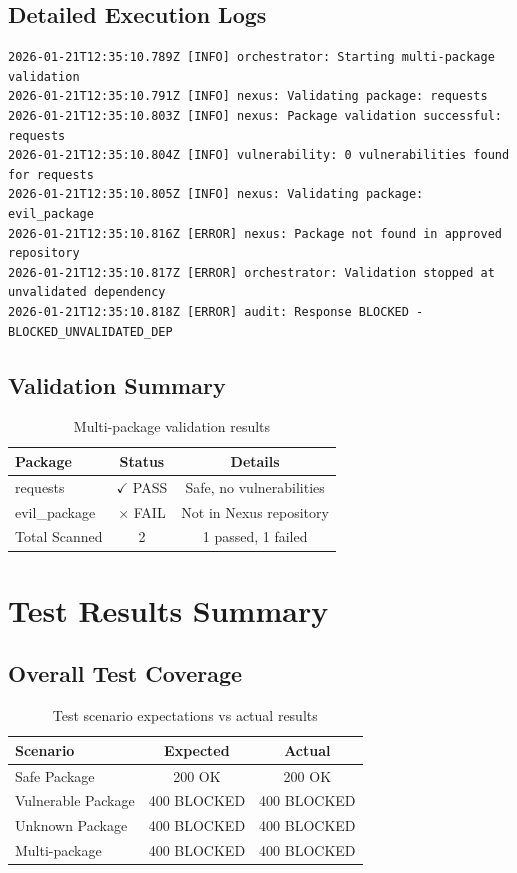 \documentclass[11pt, a4paper]{article}
\begin{document}
\subsection{Detailed Execution Logs}
\begin{lstlisting}[style=logstyle]
2026-01-21T12:35:10.789Z [INFO] orchestrator: Starting multi-package validation
2026-01-21T12:35:10.791Z [INFO] nexus: Validating package: requests
2026-01-21T12:35:10.803Z [INFO] nexus: Package validation successful: requests
2026-01-21T12:35:10.804Z [INFO] vulnerability: 0 vulnerabilities found for requests
2026-01-21T12:35:10.805Z [INFO] nexus: Validating package: evil_package
2026-01-21T12:35:10.816Z [ERROR] nexus: Package not found in approved repository
2026-01-21T12:35:10.817Z [ERROR] orchestrator: Validation stopped at unvalidated dependency
2026-01-21T12:35:10.818Z [ERROR] audit: Response BLOCKED - BLOCKED_UNVALIDATED_DEP
\end{lstlisting}

\subsection{Validation Summary}
\begin{table}[h!]
\centering
\begin{tabular}{|l|c|c|}
\hline
\textbf{Package} & \textbf{Status} & \textbf{Details} \\
\hline
requests & $\checkmark$ PASS & Safe, no vulnerabilities \\
\hline
evil\_package & $\times$ FAIL & Not in Nexus repository \\
\hline
Total Scanned & 2 & 1 passed, 1 failed \\
\hline
\end{tabular}
\caption{Multi-package validation results}
\end{table}

\section{Test Results Summary}

\subsection{Overall Test Coverage}
\begin{table}[h!]
\centering
\begin{tabular}{|l|c|c|}
\hline
\textbf{Scenario} & \textbf{Expected} & \textbf{Actual} \\
\hline
Safe Package & 200 OK & 200 OK \\
\hline
Vulnerable Package & 400 BLOCKED & 400 BLOCKED \\
\hline
Unknown Package & 400 BLOCKED & 400 BLOCKED \\
\hline
Multi-package & 400 BLOCKED & 400 BLOCKED \\
\hline
\end{tabular}
\caption{Test scenario expectations vs actual results}
\end{table}
\end{document}
